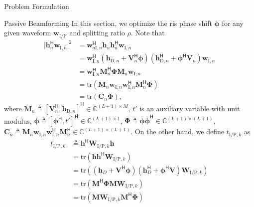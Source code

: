 \begin{section}{Problem Formulation}
	\begin{subsection}{Passive Beamforming}
		In this section, we optimize the \gls{ris} phase shift $\mathbf{\phi}$ for any given waveform $\mathbf{w}_{\mathrm{I/P}}$ and splitting ratio $\rho$. Note that
		\begin{align}
			\lvert \mathbf{h}_{n}^\mathsf{H}\mathbf{w}_{\mathrm{I},n} \rvert^2
			& = \mathbf{w}_{a\mathrm{I},n}^\mathsf{H}\mathbf{h}_n\mathbf{h}_n^\mathsf{H}\mathbf{w}_{\mathrm{I},n}\nonumber\\
			& = \mathbf{w}_{\mathrm{I},n}^\mathsf{H}(\mathbf{h}_{\mathrm{D},n}+\mathbf{V}_n^\mathsf{H}\mathbf{\phi})(\mathbf{h}_{\mathrm{D},n}^\mathsf{H}+\mathbf{\phi}^\mathsf{H}\mathbf{V}_n)\mathbf{w}_{\mathrm{I},n}\nonumber\\
			& = \mathbf{w}_{\mathrm{I},n}^\mathsf{H}\mathbf{M}_n^\mathsf{H}\mathbf{\Phi}\mathbf{M}_n\mathbf{w}_{\mathrm{I},n}\nonumber\\
			& = \mathrm{tr}(\mathbf{M}_n\mathbf{w}_{\mathrm{I},n}\mathbf{w}_{\mathrm{I},n}^\mathsf{H}\mathbf{M}_n^\mathsf{H}\mathbf{\Phi})\nonumber\\
			& = \mathrm{tr}(\mathbf{C}_n\mathbf{\Phi}),
		\end{align}
		where $\mathbf{M}_n \triangleq [\mathbf{V}_n^\mathsf{H}, \mathbf{h}_{\mathrm{D},n}]^\mathsf{H} \in \mathbb{C}^{(L+1) \times M}$, $t'$ is an auxiliary variable with unit modulus, $\bar{\mathbf{\phi}} \triangleq [\mathbf{\phi}^\mathsf{H}, t']^\mathsf{H} \in \mathbb{C}^{(L+1) \times 1}$, $\mathbf{\Phi} \triangleq \bar{\mathbf{\phi}}\bar{\mathbf{\phi}}^\mathsf{H} \in \mathbb{C}^{(L+1) \times (L+1)}$, $\mathbf{C}_n \triangleq \mathbf{M}_n\mathbf{w}_{\mathrm{I},n}\mathbf{w}_{\mathrm{I},n}^\mathsf{H}\mathbf{M}_n^\mathsf{H} \in \mathbb{C}^{(L+1)\times(L+1)}$. On the other hand, we define $t_{\mathrm{I/P},k}$ as
		\begin{align}
			t_{\mathrm{I/P},k}
			& \triangleq \mathbf{h}^\mathsf{H}\mathbf{W}_{\mathrm{I/P},k}\mathbf{h}\nonumber\\
			& = \mathrm{tr}(\mathbf{h}\mathbf{h}^\mathsf{H}\mathbf{W}_{\mathrm{I/P},k})\nonumber\\
			& = \mathrm{tr}\left((\mathbf{h}_{D}+\mathbf{V}^\mathsf{H}\mathbf{\phi})(\mathbf{h}_{D}^\mathsf{H}+\mathbf{\phi}^\mathsf{H}\mathbf{V})\mathbf{W}_{\mathrm{I/P},k}\right)\nonumber\\
			& = \mathrm{tr}(\mathbf{M}^\mathsf{H}\mathbf{\Phi}\mathbf{M}\mathbf{W}_{\mathrm{I/P},k})\nonumber\\
			& = \mathrm{tr}(\mathbf{M}\mathbf{W}_{\mathrm{I/P},k}\mathbf{M}^\mathsf{H}\mathbf{\Phi})\nonumber\\

\end{align}
\end{subsection}
\end{section}
